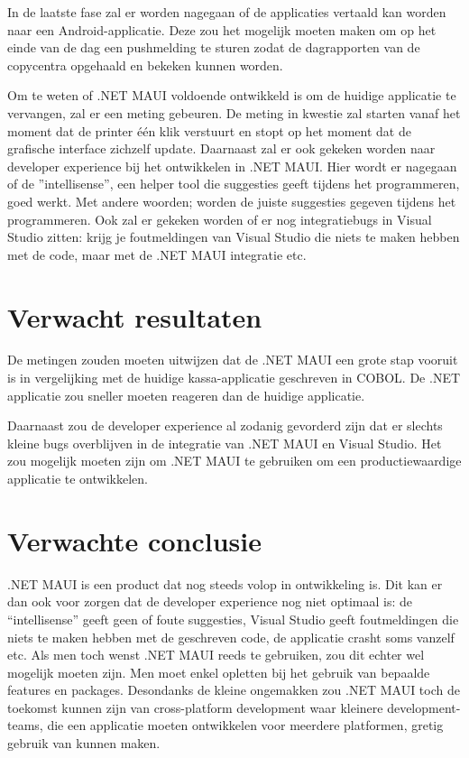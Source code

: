 In de laatste fase zal er worden nagegaan of de applicaties vertaald kan worden naar een Android-applicatie. Deze zou het mogelijk moeten maken om op het einde van de dag een pushmelding te sturen zodat de dagrapporten van de copycentra opgehaald en bekeken kunnen worden.

Om te weten of .NET MAUI voldoende ontwikkeld is om de huidige applicatie te vervangen, zal er een meting gebeuren. De meting in kwestie zal starten vanaf het moment dat de printer één klik verstuurt en stopt op het moment dat de grafische interface zichzelf update. 
Daarnaast zal er ook gekeken worden naar developer experience bij het ontwikkelen in .NET MAUI. Hier wordt er nagegaan of de ”intellisense”, een helper tool die suggesties geeft tijdens het programmeren, goed werkt. Met andere woorden; worden de juiste suggesties gegeven tijdens het programmeren. Ook zal er gekeken worden of er nog integratiebugs in Visual Studio zitten: krijg je foutmeldingen van Visual Studio die niets te maken hebben met de code, maar met de .NET MAUI integratie etc.

\section{Verwacht resultaten}%
\label{sec:verwachte_resultaten}

De metingen zouden moeten uitwijzen dat de .NET MAUI een grote stap vooruit is in vergelijking met de huidige kassa-applicatie geschreven in COBOL. De .NET applicatie zou sneller moeten reageren dan de huidige applicatie.

Daarnaast zou de developer experience al zodanig gevorderd zijn dat er slechts kleine bugs overblijven in de integratie van .NET MAUI en Visual Studio. Het zou mogelijk moeten zijn om .NET MAUI te gebruiken om een productiewaardige applicatie te ontwikkelen.

\section{Verwachte conclusie}
\label{sec:verwachte_conclusie}

.NET MAUI is een product dat nog steeds volop in ontwikkeling is. Dit kan er dan ook voor zorgen dat de developer experience nog niet optimaal is: de “intellisense” geeft geen of foute suggesties, Visual Studio geeft foutmeldingen die niets te maken hebben met de geschreven code, de applicatie crasht soms vanzelf etc. Als men toch wenst .NET MAUI reeds te gebruiken, zou dit echter wel mogelijk moeten zijn. Men moet enkel opletten bij het gebruik van bepaalde features en packages.
Desondanks de kleine ongemakken zou .NET MAUI toch de toekomst kunnen zijn van cross-platform development waar kleinere development-teams, die een applicatie moeten ontwikkelen voor meerdere platformen, gretig gebruik van kunnen maken.